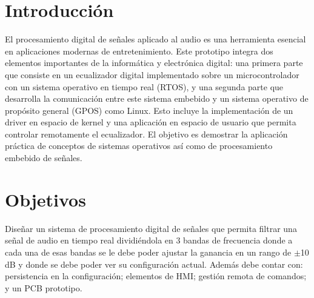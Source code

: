 \documentclass[RT]{UTNLSE}
\begin{document}
\tableofcontents
\newpage

\section{Introducción}
El procesamiento digital de señales aplicado al audio es una herramienta esencial en aplicaciones modernas de entretenimiento. Este prototipo integra dos elementos importantes de la informática y electrónica digital: una primera parte que consiste en un ecualizador digital implementado sobre un microcontrolador con un sistema operativo en tiempo real (RTOS), y una segunda parte que desarrolla la comunicación entre este sistema embebido y un sistema operativo de propósito general (GPOS) como Linux. Esto incluye la implementación de un driver en espacio de kernel y una aplicación en espacio de usuario que permita controlar remotamente el ecualizador. El objetivo es demostrar la aplicación práctica de conceptos de sistemas operativos \cite{intel386, ldd3} así como de procesamiento embebido de señales.

\section{Objetivos}
Diseñar un sistema de procesamiento digital de señales que permita filtrar una señal de audio en tiempo real dividiéndola en 3 bandas de frecuencia donde a cada una de esas bandas se le debe poder ajustar la ganancia en un rango de $\pm$10 dB y donde se debe poder ver su configuración actual. Además debe contar con: persistencia en la configuración; elementos de HMI; gestión remota de comandos; y un PCB prototipo.

\end{document}
